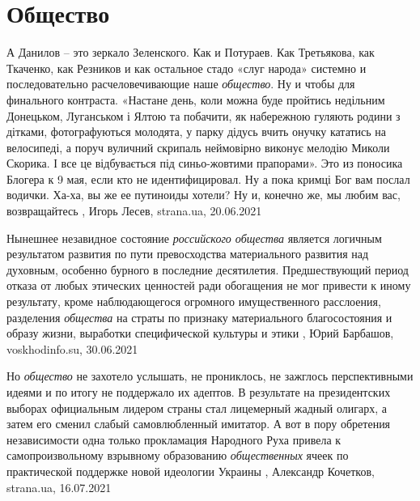  
 
 
 
 
\chapter{Общество}
\label{sec:slova.obschestvo}

А Данилов – это зеркало Зеленского. Как и Потураев. Как Третьякова, как
Ткаченко, как Резников и как остальное стадо «слуг народа» системно и
последовательно расчеловечивающие наше \emph{общество}.  Ну и чтобы для финального
контраста. «Настане день, коли можна буде пройтись недільним Донецьком,
Луганськом і Ялтою та побачити, як набережною гуляють родини з дітками,
фотографуються молодята, у парку дідусь вчить онучку кататись на велосипеді, а
поруч вуличний скрипаль неймовірно виконує мелодію Миколи Скорика. І все це
відбувається під синьо-жовтими прапорами». Это из поносика Блогера к 9 мая,
если кто не идентифицировал. Ну а пока кримці Бог вам послал водички. Ха-ха, вы
же ее путиноиды хотели? Ну и, конечно же, мы любим вас, возвращайтесь
, 
Игорь Лесев, strana.ua, 20.06.2021

Нынешнее незавидное состояние \emph{российского общества} является логичным
результатом развития по пути превосходства материального развития над духовным,
особенно бурного в последние десятилетия. Предшествующий период отказа от
любых этических ценностей ради обогащения не мог привести к иному результату,
кроме наблюдающегося огромного имущественного расслоения, разделения \emph{общества}
на страты по признаку материального благосостояния и образу жизни, выработки
специфической культуры и этики
, 
Юрий Барбашов, voskhodinfo.su, 30.06.2021

Но \emph{общество} не захотело услышать, не прониклось, не зажглось перспективными
идеями и по итогу не поддержало их адептов. В результате на президентских
выборах официальным лидером страны стал лицемерный жадный олигарх, а затем его
сменил слабый самовлюбленный имитатор.
А вот в пору обретения независимости одна только прокламация Народного Руха
привела к самопроизвольному взрывному образованию \emph{общественных} ячеек по
практической поддержке новой идеологии Украины
, 
Александр Кочетков, strana.ua, 16.07.2021
